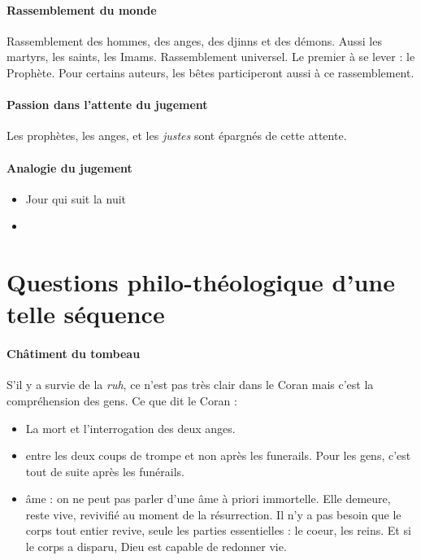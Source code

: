 \paragraph{Rassemblement du monde} Rassemblement des hommes, des anges, des djinns et des démons. Aussi les martyrs, les saints, les Imams. Rassemblement universel.
Le premier à se lever : le Prophète. 
Pour certains auteurs, les bêtes participeront aussi à ce rassemblement.

\paragraph{Passion dans l'attente du jugement} Les prophètes, les anges, et les \textit{justes} sont épargnés de cette attente.

\paragraph{Analogie du jugement}
\begin{itemize}
    \item Jour qui suit la nuit
    \item 
\end{itemize}


\section{Questions philo-théologique d'une telle séquence}

\paragraph{Châtiment du tombeau} S'il y a survie de la \textit{ruh}, ce n'est pas très clair dans le Coran mais c'est la compréhension des gens. 
Ce que dit le Coran : 
\begin{itemize}
    \item La mort et l'interrogation des deux anges.
    \item entre les deux coups de trompe et non après les funerails. Pour les gens, c'est tout de suite après les funérails.
    \item âme : on ne peut pas parler d'une âme à priori immortelle. Elle demeure, reste vive, revivifié au moment de la résurrection. Il n'y a pas besoin que le corps tout entier revive, seule les parties essentielles : le coeur, les reins. Et si le corps a disparu, Dieu est capable de redonner vie. 
\end{itemize}

